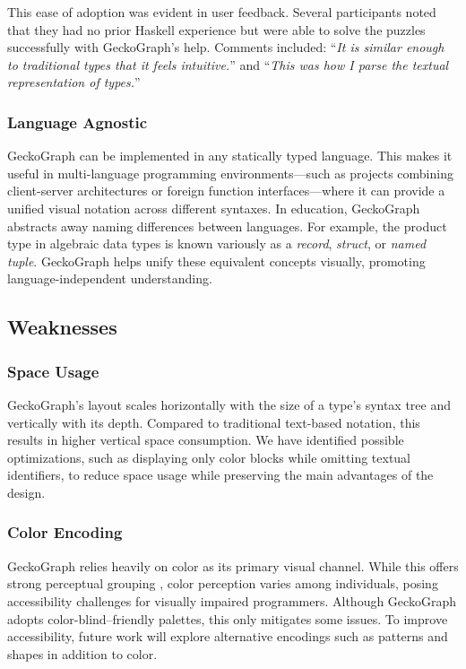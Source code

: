 \documentclass[preprint,12pt]{elsarticle}
\begin{document}
This ease of adoption was evident in user feedback. Several participants noted that they had no prior Haskell experience but were able to solve the puzzles successfully with GeckoGraph’s help. 
Comments included: 
``{\it It is similar enough to traditional types that it feels intuitive.}'' and 
``{\it This was how I parse the textual representation of types.}''

\subsubsection{Language Agnostic}
GeckoGraph can be implemented in any statically typed language. 
This makes it useful in multi-language programming environments—such as projects combining client-server architectures or foreign function interfaces—where it can provide a unified visual notation across different syntaxes. 
In education, GeckoGraph abstracts away naming differences between languages. 
For example, the product type in algebraic data types is known variously as a \textit{record}, \textit{struct}, or \textit{named tuple}. 
GeckoGraph helps unify these equivalent concepts visually, promoting language-independent understanding.

\subsection{Weaknesses}\label{sec:discussion:weaknesses}
\subsubsection{Space Usage}\label{subsec:space}
GeckoGraph’s layout scales horizontally with the size of a type’s syntax tree and vertically with its depth. 
Compared to traditional text-based notation, this results in higher vertical space consumption. 
We have identified possible optimizations, such as displaying only color blocks while omitting textual identifiers, to reduce space usage while preserving the main advantages of the design.

\subsubsection{Color Encoding}
GeckoGraph relies heavily on color as its primary visual channel. 
While this offers strong perceptual grouping \cite{Zeng2023-jz}, color perception varies among individuals, posing accessibility challenges for visually impaired programmers. 
Although GeckoGraph adopts color-blind–friendly palettes, this only mitigates some issues. 
To improve accessibility, future work will explore alternative encodings such as patterns and shapes in addition to color.
\end{document}
